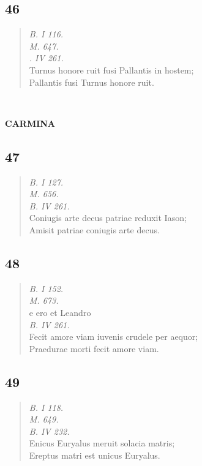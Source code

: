 \documentclass[11pt, a4paper]{report}
\begin{document}
            \subsection*{46}
      \begin{verse}
      \textit{B. I 116.} \\ \textit{M. 647.} \\ \textit{. IV 261.} \\ Turnus honore ruit fusi Pallantis in hostem; \\ Pallantis fusi Turnus honore ruit. \\ 
      \end{verse}
  
            
        ﻿\pagebreak 
    
             \marginpar{[104]} 
            \begin{center} \textbf{CARMINA} \end{center}
            \subsection*{47}
      \begin{verse}
      \textit{B. I 127.} \\ \textit{M. 656.} \\ \textit{B. IV 261.} \\ Coniugis arte decus patriae reduxit Iason; \\ Amisit patriae coniugis arte decus. \\ 
      \end{verse}
  
            \subsection*{48}
      \begin{verse}
      \textit{B. I 152.} \\ \textit{M. 673.} \\ e ero et Leandro \\ \textit{B. IV 261.} \\ Fecit amore viam iuvenis crudele per aequor; \\ Praedurae morti fecit amore viam. \\ 
      \end{verse}
  
            \subsection*{49}
      \begin{verse}
      \textit{B. I 118.} \\ \textit{M. 649.} \\ \textit{B. IV 232.} \\ Enicus Euryalus meruit solacia matris; \\ Ereptus matri est unicus Euryalus. \\ 
      \end{verse}
  
\end{document}
